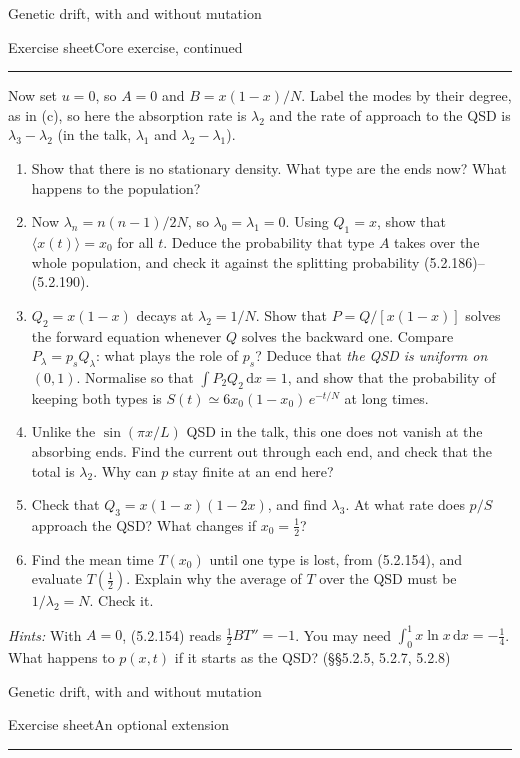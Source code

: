 \documentclass[11pt]{article}
\newcommand{\dd}{\mathrm{d}}
\newcommand{\avg}[1]{\langle #1\rangle}
\newcommand{\sheethead}[1]{%
  {\sffamily\Large\color{PineGreen}Genetic drift, with and without mutation}\par\vspace{2pt}
  {\sffamily\small Exercise sheet\hfill #1}\par\vspace{-7pt}
  \rule{\textwidth}{0.5pt}\par\vspace{2pt}}
\newcommand{\exsec}[1]{\par\vspace{4pt}{\sffamily\bfseries\large\color{PineGreen}#1}\par\vspace{-2pt}}
\begin{document}
\vfill
\newpage

\sheethead{Core exercise, continued}

\exsec{(d) Switch off mutation}
Now set $u=0$, so $A=0$ and $B=x(1-x)/N$. Label the modes by their degree, as in (c), so here the absorption rate
is $\lambda_2$ and the rate of approach to the QSD is $\lambda_3-\lambda_2$ (in the talk, $\lambda_1$ and
$\lambda_2-\lambda_1$).
\begin{enumerate}
  \item Show that there is no stationary density. What type are the ends now? What happens to the population?
  \item Now $\lambda_n=n(n-1)/2N$, so $\lambda_0=\lambda_1=0$. Using $Q_1=x$, show that $\avg{x(t)}=x_0$ for all
        $t$. Deduce the probability that type $A$ takes over the whole population, and check it against the
        splitting probability (5.2.186)--(5.2.190).
  \item $Q_2=x(1-x)$ decays at $\lambda_2=1/N$. Show that $P=Q/[x(1-x)]$ solves the forward equation whenever $Q$
        solves the backward one. Compare $P_\lambda=p_sQ_\lambda$: what plays the role of $p_s$? Deduce that
        \emph{the QSD is uniform on $(0,1)$}. Normalise so that $\int P_2Q_2\,\dd x=1$, and show that the
        probability of keeping both types is $S(t)\simeq6x_0(1-x_0)\,e^{-t/N}$ at long times.
  \item Unlike the $\sin(\pi x/L)$ QSD in the talk, this one does not vanish at the absorbing ends. Find the current
        out through each end, and check that the total is $\lambda_2$. Why can $p$ stay finite at an end here?
  \item Check that $Q_3=x(1-x)(1-2x)$, and find $\lambda_3$. At what rate does $p/S$ approach the QSD? What changes
        if $x_0=\frac12$?
  \item Find the mean time $T(x_0)$ until one type is lost, from (5.2.154), and evaluate $T(\frac12)$. Explain why
        the average of $T$ over the QSD must be $1/\lambda_2=N$. Check it.
\end{enumerate}
\emph{Hints:} With $A=0$, (5.2.154) reads $\tfrac12BT''=-1$. You may need $\int_0^1x\ln x\,\dd x=-\tfrac14$.
What happens to $p(x,t)$ if it starts as the QSD? (\S\S5.2.5, 5.2.7, 5.2.8)

\vfill
\newpage

\sheethead{An optional extension}
\end{document}
